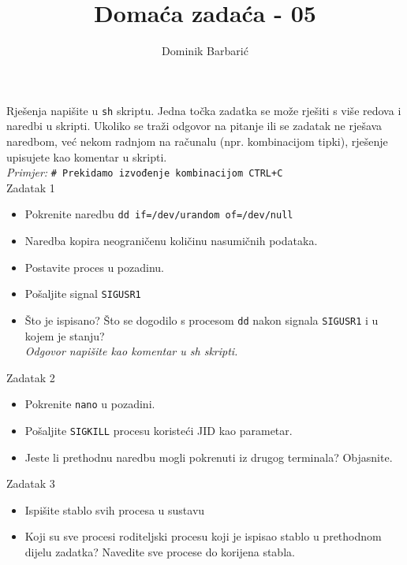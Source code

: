 \documentclass[12pt,a4paper]{article}
\newcommand{\shell}[1]{\texttt{#1}}
\begin{document}
	\title{Domaća zadaća - 05}
	\author{Dominik Barbarić}
	\maketitle
	Rješenja napišite u \shell{sh} skriptu. Jedna točka zadatka se može rješiti s više redova i naredbi u skripti. Ukoliko se traži odgovor na pitanje ili se zadatak ne rješava naredbom, već nekom radnjom na računalu (npr. kombinacijom tipki), rješenje upisujete kao komentar u skripti.\\
	\emph{Primjer:} \shell{\# Prekidamo izvođenje kombinacijom CTRL+C}\\
	
	Zadatak 1
		\begin{itemize}
			\item Pokrenite naredbu \shell{dd if=/dev/urandom of=/dev/null}
			\item[] Naredba kopira neograničenu količinu nasumičnih podataka.
			\item Postavite proces u pozadinu.
			\item Pošaljite signal \shell{SIGUSR1}
			\item Što je ispisano? Što se dogodilo s procesom \shell{dd} nakon signala \shell{SIGUSR1} i u kojem je stanju? \\ \emph{Odgovor napišite kao komentar u sh skripti.}
		\end{itemize}
		
	Zadatak 2
		\begin{itemize}
			\item Pokrenite \shell{nano} u pozadini.
			\item Pošaljite \shell{SIGKILL} procesu koristeći JID kao parametar.
			\item Jeste li prethodnu naredbu mogli pokrenuti iz drugog terminala? Objasnite.
		\end{itemize}
	
	Zadatak 3
		\begin{itemize}
			\item Ispišite stablo svih procesa u sustavu
			\item Koji su sve procesi roditeljski procesu koji je ispisao stablo u prethodnom dijelu zadatka? Navedite sve procese do korijena stabla.
		\end{itemize}
\end{document}
